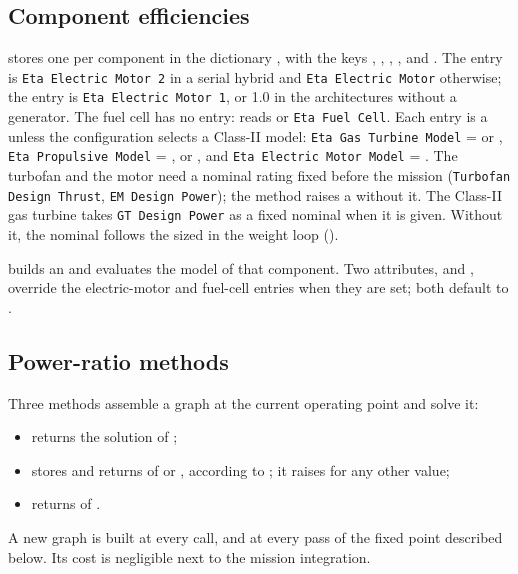 \documentclass[a4paper,11pt]{article}
\begin{document}
\subsection{Component efficiencies}
 stores one  per component in the
dictionary , with the keys ,
, , ,  and
. The  entry is \texttt{Eta Electric Motor 2} in a
serial hybrid and \texttt{Eta Electric Motor} otherwise; the  entry is
\texttt{Eta Electric Motor 1}, or 1.0 in the architectures without a generator. The fuel cell
has no entry:  reads  or \texttt{Eta Fuel Cell}. Each entry is a  unless the configuration
selects a Class-II model: \texttt{Eta Gas Turbine Model} =  or
, \texttt{Eta Propulsive Model} = ,  or
, and \texttt{Eta Electric Motor Model} = . The turbofan and the
motor need a nominal rating fixed before the mission (\texttt{Turbofan Design Thrust},
\texttt{EM Design Power}); the method raises a  without it. The Class-II gas
turbine takes \texttt{GT Design Power} as a fixed nominal when it is given. Without it, the
nominal follows the sized  in the weight loop
().

 builds an
 and evaluates the model of that component. Two attributes,
 and , override the electric-motor and fuel-cell entries when
they are set; both default to .

\subsection{Power-ratio methods}\label{sec:methods}
Three methods assemble a graph at the current operating point and solve it:
\begin{itemize}
\item {} returns the solution of
  ;
\item {} stores  and returns
   of  or , according
  to ; it raises for any other value;
\item {} returns 
  of .
\end{itemize}
A new graph is built at every call, and at every pass of the fixed point described below. Its
cost is negligible next to the mission integration.
\end{document}
